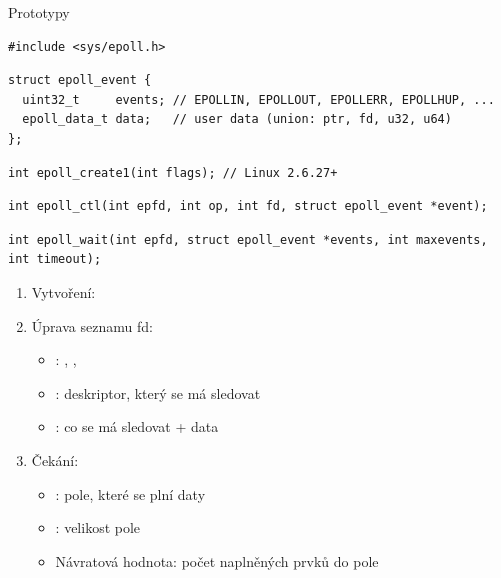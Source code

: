 \begin{frame}[fragile]{}

  \begin{block}{Prototypy}
    \begin{lstlisting}[aboveskip=2pt,belowskip=0pt]
#include <sys/epoll.h>
    \end{lstlisting}
    \begin{lstlisting}[aboveskip=0pt,belowskip=0pt]
struct epoll_event {
  uint32_t     events; // EPOLLIN, EPOLLOUT, EPOLLERR, EPOLLHUP, ...
  epoll_data_t data;   // user data (union: ptr, fd, u32, u64)
};
    \end{lstlisting}
    \begin{lstlisting}[aboveskip=0pt,belowskip=0pt]
int epoll_create1(int flags); // Linux 2.6.27+
    \end{lstlisting}
    \begin{lstlisting}[aboveskip=0pt,belowskip=0pt]
int epoll_ctl(int epfd, int op, int fd, struct epoll_event *event);
    \end{lstlisting}
    \begin{lstlisting}[aboveskip=0pt,belowskip=2pt]
int epoll_wait(int epfd, struct epoll_event *events, int maxevents, int timeout);
    \end{lstlisting}
  \end{block}


  \begin{enumerate}
    \item Vytvoření: 

    \pause

    \item Úprava seznamu fd: 
    \begin{itemize}
      \item {}: , ,
      \item {}: deskriptor, který se má sledovat
      \item {}: co se má sledovat + data
    \end{itemize}

    \pause

    \item Čekání: 
    \begin{itemize}
      \item {}: pole, které se plní daty
      \item {}: velikost pole
      \item Návratová hodnota: počet naplněných prvků do pole
    \end{itemize}
  \end{enumerate}

\end{frame}

